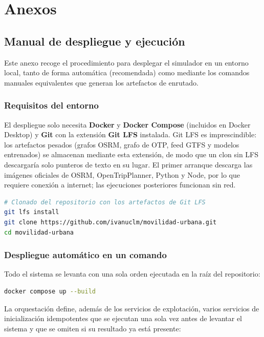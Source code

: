 \chapter{Anexos}

\section{Manual de despliegue y ejecución}
\label{anx:despliegue}

Este anexo recoge el procedimiento para desplegar el simulador en un entorno local, tanto de forma automática (recomendada) como mediante los comandos manuales equivalentes que generan los artefactos de enrutado.

\subsection{Requisitos del entorno}

El despliegue solo necesita \textbf{Docker} y \textbf{Docker Compose} (incluidos en Docker Desktop) y \textbf{Git} con la extensión \textbf{Git LFS} instalada. Git LFS es imprescindible: los artefactos pesados (grafos OSRM, grafo de OTP, feed GTFS y modelos entrenados) se almacenan mediante esta extensión, de modo que un clon sin LFS descargaría solo punteros de texto en su lugar. El primer arranque descarga las imágenes oficiales de OSRM, OpenTripPlanner, Python y Node, por lo que requiere conexión a internet; las ejecuciones posteriores funcionan sin red.

\begin{lstlisting}[language=bash]
# Clonado del repositorio con los artefactos de Git LFS
git lfs install
git clone https://github.com/ivanuclm/movilidad-urbana.git
cd movilidad-urbana
\end{lstlisting}

\subsection{Despliegue automático en un comando}

Todo el sistema se levanta con una sola orden ejecutada en la raíz del repositorio:

\begin{lstlisting}[language=bash]
docker compose up --build
\end{lstlisting}

La orquestación define, además de los servicios de explotación, varios servicios de inicialización idempotentes que se ejecutan una sola vez antes de levantar el sistema y que se omiten si su resultado ya está presente:

